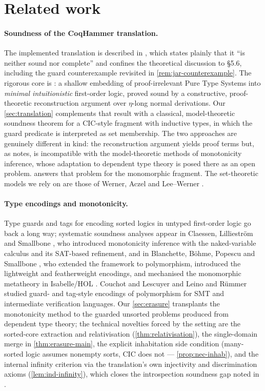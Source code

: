 \section{Related work}
\label{sec:related}

\paragraph{Soundness of the CoqHammer translation.}
The implemented translation is described in
\cite{CzajkaKaliszyk2018}, which states plainly that it ``is
neither sound nor complete'' and confines the theoretical
discussion to \S5.6, including the guard counterexample revisited
in \cref{rem:jar-counterexample}.  The rigorous core is
\cite{Czajka2016}: a shallow embedding of proof-irrelevant Pure
Type Systems into \emph{minimal intuitionistic} first-order logic,
proved sound by a constructive, proof-theoretic reconstruction
argument over $\eta$-long normal derivations.  Our
\cref{sec:translation} complements that result with a classical,
model-theoretic soundness theorem for a CIC-style fragment with
inductive types, in which the guard predicate is interpreted as set
membership.  The two approaches are genuinely different in kind:
the reconstruction argument yields proof terms but, as
\cite[\S6]{Czajka2016} notes, is incompatible with the
model-theoretic methods of monotonicity inference, whose adaptation
to dependent type theory is posed there as an open problem.
 answers that problem for the monomorphic
fragment.  The set-theoretic models we rely on are those of
Werner, Aczel and Lee--Werner
\cite{Werner1997,Aczel1998,LeeWerner2011}.

\paragraph{Type encodings and monotonicity.}
Type guards and tags for encoding sorted logics in untyped
first-order logic go back a long way; systematic soundness analyses
appear in Claessen, Lillieström and Smallbone \cite{Claessen2011},
who introduced monotonicity inference with the naked-variable
calculus and its SAT-based refinement, and in Blanchette, B\"ohme,
Popescu and Smallbone \cite{Blanchette2016}, who extended the
framework to polymorphism, introduced the lightweight and
featherweight encodings, and mechanised the monomorphic metatheory
in Isabelle/HOL \cite{BlanchettePopescu2013}.  Couchot and Lescuyer
\cite{CouchotLescuyer2007} and Leino and R\"ummer
\cite{LeinoRummer2010} studied guard- and tag-style encodings of
polymorphism for SMT and intermediate verification languages.  Our
\cref{sec:erasure} transplants the monotonicity method to the
guarded unsorted problems produced from dependent type theory; the
technical novelties forced by the setting are the sorted-core
extraction and relativisation (\cref{thm:relativisation}), the
single-domain merge in \cref{thm:erasure-main}, the explicit
inhabitation side condition (many-sorted logic assumes nonempty
sorts, CIC does not --- \cref{prop:nec-inhab}), and the internal
infinity criterion via the translation's own injectivity and
discrimination axioms (\cref{lem:ind-infinity}), which closes the
introspection soundness gap noted in
\cite[\S7.4]{Blanchette2016}.

